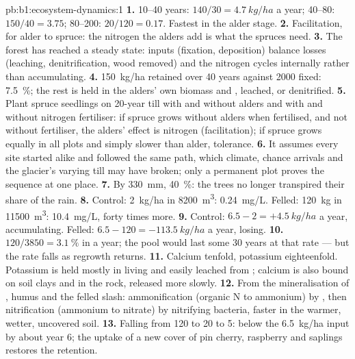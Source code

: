 \begin{solution}{pb:b1:ecosystem-dynamics:1}
\textbf{1.} 10--40 years: $140/30 = \qty{4.7}{kg/ha}$ a year; 40--80:
$150/40 = \num{3.75}$; 80--200: $20/120 = \num{0.17}$. Fastest in
the alder stage.
\textbf{2.} Facilitation, for alder to spruce: the nitrogen the alders
add is what the spruces need.
\textbf{3.} The forest has reached a steady state: inputs (fixation,
deposition) balance losses (leaching, denitrification, wood
removed) and the nitrogen cycles internally rather than accumulating.
\textbf{4.} \qty{150}{kg/ha} retained over 40 years against
\num{2000} fixed: \qty{7.5}{\%}; the rest is held in the alders'
own biomass and , leached, or denitrified.
\textbf{5.} Plant spruce seedlings on 20-year till with and without
alders and with and without nitrogen fertiliser: if spruce grows
without alders when fertilised, and not without fertiliser, the
alders' effect is nitrogen (facilitation); if spruce grows equally
in all plots and simply slower than alder, tolerance.
\textbf{6.} It assumes every site started alike and followed the same
path, which climate, chance arrivals and the glacier's varying till
may have broken; only a permanent plot proves the sequence at one
place.
\textbf{7.} By \qty{330}{mm}, \qty{40}{\%}: the trees no longer
transpired their share of the rain.
\textbf{8.} Control: \qty{2}{kg/ha} in \qty{8200}{m^3}: \qty{0.24}{mg/L}.
Felled: \qty{120}{kg} in \qty{11500}{m^3}: \qty{10.4}{mg/L}, forty
times more.
\textbf{9.} Control: $6.5 - 2 = +\qty{4.5}{kg/ha}$ a year, accumulating.
Felled: $6.5 - 120 = -\qty{113.5}{kg/ha}$ a year, losing.
\textbf{10.} $120/3850 = \qty{3.1}{\%}$ in a year; the pool would last
some \num{30} years at that rate --- but the rate falls as regrowth
returns.
\textbf{11.} Calcium tenfold, potassium eighteenfold. Potassium is held
mostly in living  and easily leached from ; calcium is
also bound on soil clays and in the rock, released more slowly.
\textbf{12.} From the mineralisation of , humus and the felled
slash: ammonification (organic N to ammonium) by , then
nitrification (ammonium to nitrate) by nitrifying bacteria, faster in
the warmer, wetter, uncovered soil.
\textbf{13.} Falling from \num{120} to \num{20} to \num{5}: below the
\qty{6.5}{kg/ha} input by about year 6; the uptake of a new cover of
pin cherry, raspberry and saplings restores the retention.

\end{solution}
